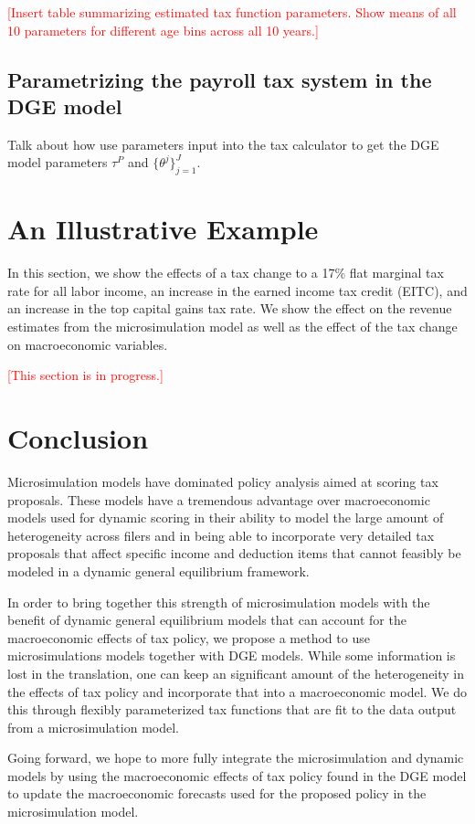 \documentclass[letterpaper,12pt]{article}
\theoremstyle{definition}
\begin{document}
\begin{spacing}{1.5}
    \noindent\textcolor{red}{[Insert table summarizing estimated tax function parameters. Show means of all 10 parameters for different age bins across all 10 years.]}


  \subsection{Parametrizing the payroll tax system in the DGE model}\label{SecPayrollDGE}

    Talk about how use parameters input into the tax calculator to get the DGE model parameters  $\tau^P$ and $\{\theta^j\}_{j=1}^J$.


\section{An Illustrative Example}\label{SecResults}

  In this section, we show the effects of a tax change to a 17\% flat marginal tax rate for all labor income, an increase in the earned income tax credit (EITC), and an increase in the top capital gains tax rate. We show the effect on the revenue estimates from the microsimulation model as well as the effect of the tax change on macroeconomic variables.

  \noindent\textcolor{red}{[This section is in progress.]}


\section{Conclusion}\label{SecConclusion}

  Microsimulation models have dominated policy analysis aimed at scoring tax proposals.  These models have a tremendous advantage over macroeconomic models used for dynamic scoring in their ability to model the large amount of heterogeneity across filers and in being able to incorporate very detailed tax proposals that affect specific income and deduction items that cannot feasibly be modeled in a dynamic general equilibrium framework.

  In order to bring together this strength of microsimulation models with the benefit of dynamic general equilibrium models that can account for the macroeconomic effects of tax policy, we propose a method to use microsimulations models together with DGE models.  While some information is lost in the translation, one can keep an significant amount of the heterogeneity in the effects of tax policy and incorporate that into a macroeconomic model.  We do this through flexibly parameterized tax functions that are fit to the data output from a microsimulation model.

  Going forward, we hope to more fully integrate the microsimulation and dynamic models by using the macroeconomic effects of tax policy found in the DGE model to update the macroeconomic forecasts used for the proposed policy in the microsimulation model.


  \clearpage


\end{spacing}
\end{document}
